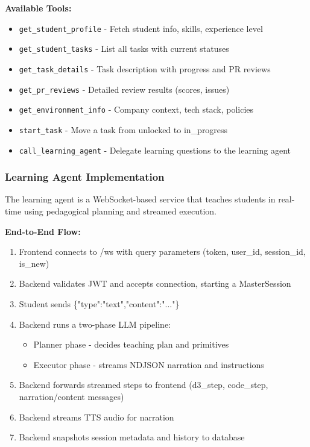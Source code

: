 \documentclass[12pt,a4paper]{report}
\begin{document}
\textbf{Available Tools:}
\begin{itemize}
    \item \texttt{get\_student\_profile} - Fetch student info, skills, experience level
    \item \texttt{get\_student\_tasks} - List all tasks with current statuses
    \item \texttt{get\_task\_details} - Task description with progress and PR reviews
    \item \texttt{get\_pr\_reviews} - Detailed review results (scores, issues)
    \item \texttt{get\_environment\_info} - Company context, tech stack, policies
    \item \texttt{start\_task} - Move a task from unlocked to in\_progress
    \item \texttt{call\_learning\_agent} - Delegate learning questions to the learning agent
\end{itemize}

\subsubsection{Learning Agent Implementation}

The learning agent is a WebSocket-based service that teaches students in real-time using pedagogical planning and streamed execution.

\textbf{End-to-End Flow:}
\begin{enumerate}
    \item Frontend connects to /ws with query parameters (token, user\_id, session\_id, is\_new)
    \item Backend validates JWT and accepts connection, starting a MasterSession
    \item Student sends \{"type":"text","content":"..."\}
    \item Backend runs a two-phase LLM pipeline:
        \begin{itemize}
            \item Planner phase - decides teaching plan and primitives
            \item Executor phase - streams NDJSON narration and instructions
        \end{itemize}
    \item Backend forwards streamed steps to frontend (d3\_step, code\_step, narration/content messages)
    \item Backend streams TTS audio for narration
    \item Backend snapshots session metadata and history to database
\end{enumerate}
\end{document}
